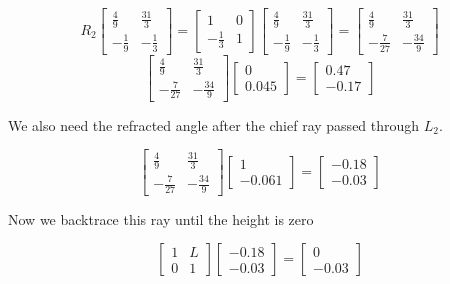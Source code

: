 \documentclass[a4paper]{article}
\begin{document}
$$R_2
\begin{bmatrix}
    \frac{4}{9} & \frac{31}{3}\\
    - \frac{1}{9} & - \frac{1}{3}
\end{bmatrix} = 
\begin{bmatrix}
    1 & 0\\
    - \frac{1}{3} & 1
\end{bmatrix} 
\begin{bmatrix}
    \frac{4}{9} & \frac{31}{3}\\
    - \frac{1}{9} & - \frac{1}{3}
\end{bmatrix} = 
\begin{bmatrix}
    \frac{4}{9} & \frac{31}{3}\\
    - \frac{7}{27} & - \frac{34}{9}
\end{bmatrix}
$$
$$
\begin{bmatrix}
    \frac{4}{9} & \frac{31}{3}\\
    - \frac{7}{27} & - \frac{34}{9}
\end{bmatrix}
\begin{bmatrix}
    0   \\
    0.045
\end{bmatrix}
=
\begin{bmatrix}
    0.47\\
    -0.17 
\end{bmatrix}
$$


We also need the refracted angle after the chief ray passed through $L_2$.

$$
\begin{bmatrix}
    \frac{4}{9} & \frac{31}{3}\\
    - \frac{7}{27} & - \frac{34}{9}
\end{bmatrix}
\begin{bmatrix}
    1   \\
    -0.061
\end{bmatrix}
=
\begin{bmatrix}
    -0.18\\
    -0.03
\end{bmatrix}
$$

Now we backtrace this ray until the height is zero

$$ 
\begin{bmatrix}
    1 & L\\
    0 & 1
\end{bmatrix}
\begin{bmatrix}
    -0.18\\
    -0.03
\end{bmatrix}
=
\begin{bmatrix}
    0 \\
    -0.03
\end{bmatrix}
$$
\end{document}
